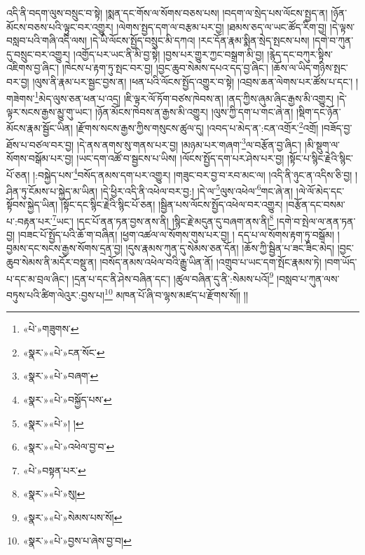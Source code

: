 འདི་ནི་བདག་ལུས་བསྲུང་བ་སྟེ། །སྨན་དང་གོས་ལ་སོགས་བཅས་པས། །བདག་ལ་སྲེད་པས་ལོངས་སྤྱད་ན། །ཉོན་མོངས་བཅས་པའི་ལྟུང་བར་འགྱུར། །ལེགས་སྤྱད་དག་ལ་བརྩམ་པར་བྱ། །ཐམས་ཅད་ལ་ཡང་ཚོད་རིག་བྱ། །དེ་ལྟས་བསླབ་པའི་གཞི་འདི་ལས། །དེ་ཡི་ལོངས་སྤྱོད་བསྲུང་མི་དཀའ། །རང་དོན་རྣམ་སྨིན་སྲེད་སྤངས་པས། །དགེ་བ་ཀུན་དུ་བསྲུང་བར་འགྱུར། །འགྱོད་པར་ཡང་ནི་མི་བྱ་སྟེ། །བྱས་པར་གྱུར་ཀྱང་བསྒྲག་མི་བྱ། །རྙེད་དང་བཀུར་སྟིས་འཇིགས་བྱ་ཞིང་། །ཁེངས་པ་རྟག་ཏུ་སྤང་བར་བྱ། །བྱང་ཆུབ་སེམས་དཔའ་དད་བྱ་ཞིང་། །ཆོས་ལ་ཡིད་གཉིས་སྤང་བར་བྱ། །ལུས་ནི་རྣམ་པར་སྦྱང་བྱས་ན། །ཕན་པའི་ལོངས་སྤྱོད་འགྱུར་བ་སྟེ། །འབྲས་ཆན་ལེགས་པར་ཚོས་པ་དང་། །གཟེགས་\footnote{«པེ་»གཟུགས་}མེད་ལུས་ཅན་ཕན་པ་འདྲ། །ཇི་ལྟར་ལོ་ཏོག་བཙས་ཁེབས་ན། །ནད་ཀྱིས་ཞུམ་ཞིང་རྒྱས་མི་འགྱུར། །དེ་ལྟར་སངས་རྒྱས་མྱུ་གུ་ཡང་། །ཉོན་མོངས་ཁེབས་ན་རྒྱས་མི་འགྱུར། །ལུས་ཀྱི་དག་པ་གང་ཞེ་ན། །སྡིག་དང་ཉོན་མོངས་རྣམ་སྦྱོང་ཡིན། །རྫོགས་སངས་རྒྱས་ཀྱིས་གསུངས་ཚུལ་དུ། །འབད་པ་མེད་ན་:ངན་འགྲོར་\footnote{«སྣར་»«པེ་»ངན་སོང་}འགྲོ། །བཟོད་བྱ་ཐོས་པ་བཙལ་བར་བྱ། །དེ་ནས་ནགས་སུ་གནས་པར་བྱ། །མཉམ་པར་གཞག་\footnote{«སྣར་»«པེ་»བཞག་}ལ་བརྩོན་བྱ་ཞིང་། །མི་སྡུག་ལ་སོགས་བསྒོམ་པར་བྱ། །ཡང་དག་འཚོ་བ་སྦྱངས་པ་ཡིས། །ལོངས་སྤྱོད་དག་པར་ཤེས་པར་བྱ། །སྟོང་པ་སྙིང་རྗེའི་སྙིང་པོ་ཅན། །:བསྐྱེད་པས་\footnote{«སྣར་»«པེ་»བསྐྱོད་པས་}བསོད་ནམས་དག་པར་འགྱུར། །གཟུང་བར་བྱ་བ་རབ་མང་ལ། །འདི་ནི་ཉུང་ན་འདིས་ཅི་བྱ། །ཤིན་ཏུ་ངོམས་པ་སྐྱེད་མ་ཡིན། །དེ་ཕྱིར་འདི་ནི་འཕེལ་བར་བྱ:། །དེ་ལ་\footnote{«སྣར་»«པེ་»། །}ལུས་འཕེལ་\footnote{«སྣར་»«པེ་»འཕེལ་བྱ་བ་}གང་ཞེ་ན། །ལེ་ལོ་མེད་དང་སྟོབས་སྐྱེད་ཡིན། །སྟོང་དང་སྙིང་རྗེའི་སྙིང་པོ་ཅན། །སྦྱིན་པས་ལོངས་སྤྱོད་འཕེལ་བར་འགྱུར། །བརྩོན་དང་བསམ་པ་:བརྟན་པར་\footnote{«པེ་»བསྟན་པར་}ཡང་། །དང་པོ་ནན་ཏན་བྱས་ནས་ནི། །སྙིང་རྗེ་མདུན་དུ་བཞག་ནས་ནི།\footnote{«སྣར་»«པེ་»སུ།} །དགེ་བ་སྤེལ་ལ་ནན་ཏན་བྱ། །བཟང་པོ་སྤྱོད་པའི་ཆོ་ག་བཞིན། །ཕྱག་འཚལ་ལ་སོགས་གུས་པར་བྱ། །
དད་པ་ལ་སོགས་རྟག་ཏུ་བསྒོམ། །བྱམས་དང་སངས་རྒྱས་སོགས་དྲན་བྱ། །དུས་རྣམས་ཀུན་དུ་སེམས་ཅན་དོན། །ཆོས་ཀྱི་སྦྱིན་པ་ཟང་ཟིང་མེད། །བྱང་ཆུབ་སེམས་ནི་མདོར་བསྡུ་ན། །བསོད་ནམས་འཕེལ་བའི་རྒྱུ་ཡིན་ནོ། །འགྲུབ་པ་ཡང་དག་སྤོང་རྣམས་ཏེ། །བག་ཡོད་པ་དང་མ་བྲལ་ཞིང་། །དྲན་པ་དང་ནི་ཤེས་བཞིན་དང་། །ཚུལ་བཞིན་དུ་ནི་:སེམས་པའོ།\footnote{«སྣར་»«པེ་»སེམས་པས་སོ།} །བསླབ་པ་ཀུན་ལས་བཏུས་པའི་ཚིག་ལེའུར་:བྱས་པ།\footnote{«སྣར་»«པེ་»བྱས་པ་ཞེས་བྱ་བ།} མཁན་པོ་ཞི་བ་ལྷས་མཛད་པ་རྫོགས་སོ།། །།